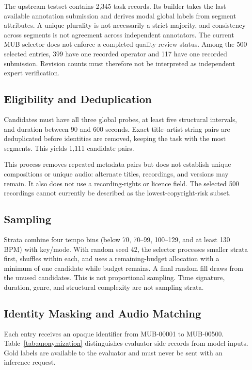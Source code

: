 \documentclass[11pt,a4paper]{article}
\begin{document}
The upstream testset contains 2,345 task records. Its builder takes the last available annotation submission and derives modal global labels from segment attributes. A unique plurality is not necessarily a strict majority, and consistency across segments is not agreement across independent annotators. The current MUB selector does not enforce a completed quality-review status. Among the 500 selected entries, 399 have one recorded operator and 117 have one recorded submission. Revision counts must therefore not be interpreted as independent expert verification.

\subsection{Eligibility and Deduplication}
\label{sec:selection}
Candidates must have all three global probes, at least five structural intervals, and duration between 90 and 600 seconds. Exact title--artist string pairs are deduplicated before identities are removed, keeping the task with the most segments. This yields 1,111 candidate pairs.

This process removes repeated metadata pairs but does not establish unique compositions or unique audio: alternate titles, recordings, and versions may remain. It also does not use a recording-rights or licence field. The selected 500 recordings cannot currently be described as the lowest-copyright-risk subset.

\subsection{Sampling}
Strata combine four tempo bins (below 70, 70--99, 100--129, and at least 130 BPM) with key/mode. With random seed 42, the selector processes smaller strata first, shuffles within each, and uses a remaining-budget allocation with a minimum of one candidate while budget remains. A final random fill draws from the unused candidates. This is not proportional sampling. Time signature, duration, genre, and structural complexity are not sampling strata.

\subsection{Identity Masking and Audio Matching}
\label{sec:anonymization}
Each entry receives an opaque identifier from MUB-00001 to MUB-00500. Table~\ref{tab:anonymization} distinguishes evaluator-side records from model inputs. Gold labels are available to the evaluator and must never be sent with an inference request.
\end{document}

